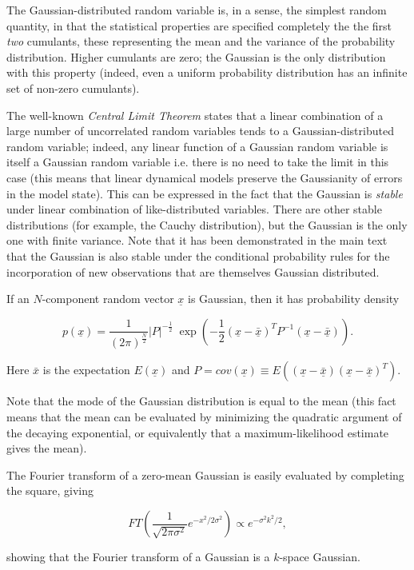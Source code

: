 The Gaussian-distributed random variable is, in a sense, the simplest random quantity, in that the statistical properties are specified completely the the first {\it two} cumulants, these representing the mean and the variance of the probability distribution.  
Higher cumulants are zero; the Gaussian is the only distribution with this property (indeed, even a uniform probability distribution has an infinite set of non-zero cumulants).

The well-known {\it Central Limit Theorem} states that a linear combination of a large number of uncorrelated random variables tends to a Gaussian-distributed random variable; indeed, any linear function of a Gaussian random variable is itself a Gaussian random variable i.e. there is no need to take the limit in this case (this means that linear dynamical models preserve the Gaussianity of errors in the model state).  
This can be expressed in the fact that the Gaussian is {\it stable} under linear combination of like-distributed variables.  
There are other stable distributions (for example, the Cauchy distribution), but the Gaussian is the only one with finite variance.  
Note that it has been demonstrated in the main text that the Gaussian is also stable under the conditional probability rules for the incorporation of new observations that are themselves Gaussian distributed.

If an $N$-component random vector $\underline{x}$ is Gaussian, then it has probability density

\begin{equation}
p(\underline{x}) = \frac{1}{(2 \pi)^{\frac{N}{2}}} |P|^{-\frac{1}{2}} \; \exp \left ( -\frac{1}{2} (\underline{x}-\underline{\bar{x}})^T  P^{-1} (\underline{x}-\underline{\bar{x}}) \right ).
\end{equation}

Here $\bar{x}$ is the expectation $E(\underline{x})$ and $P = cov(\underline{x}) \equiv E((\underline{x}-\underline{\bar{x}})(\underline{x}-\underline{\bar{x}})^T)$.

Note that the mode of the Gaussian distribution is equal to the mean (this fact means that the mean can be evaluated by minimizing the quadratic argument of the decaying exponential, or equivalently that a maximum-likelihood estimate gives the mean).

The Fourier transform of a zero-mean Gaussian is easily evaluated by completing the square, giving

\begin{equation}
FT \left ( \frac{1}{\sqrt{2 \pi \sigma^2}} e^{-x^2 / 2 \sigma^2} \right ) \propto e^{-\sigma^2 k^2 / 2},
\end{equation}

showing that the Fourier transform of a Gaussian is a $k$-space Gaussian.
